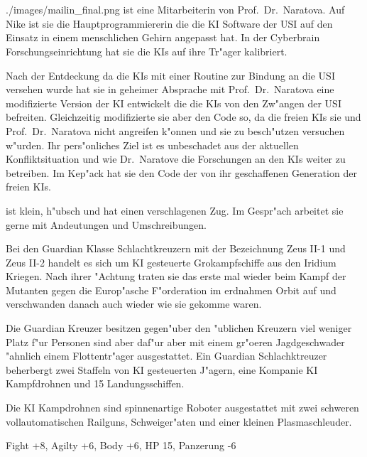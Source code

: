 \newpage
\section[Mailin]{\ml{}}

\begin{sideimagebox}[r]{0.6}{./images/mailin_final.png}{\ml}
    \ml{} ist eine Mitarbeiterin von Prof.~Dr.~Naratova. Auf Nike ist sie die Hauptprogrammiererin die die KI Software der USI auf den Einsatz in einem menschlichen Gehirn angepasst hat.  In der Cyberbrain Forschungseinrichtung hat sie die KIs auf ihre Tr"ager kalibriert.

    Nach der Entdeckung da\3 die KIs mit einer Routine zur Bindung an die USI versehen wurde hat sie in geheimer Absprache mit Prof.~Dr.~Naratova eine modifizierte Version der KI entwickelt die die KIs von den Zw"angen der USI befreiten. Gleichzeitig modifizierte sie aber den Code so, da\3 die freien KIs sie und Prof.~Dr.~Naratova nicht angreifen k"onnen und sie zu besch"utzen versuchen w"urden. Ihr pers"onliches Ziel ist es unbeschadet aus der aktuellen Konfliktsituation und wie Dr.~Naratove die Forschungen an den KIs weiter zu betreiben. Im Kep"ack hat sie den Code der von ihr geschaffenen Generation der freien KIs.

    \ml{} ist klein, h"ubsch und hat einen verschlagenen Zug. Im Gespr"ach arbeitet sie gerne mit Andeutungen und Umschreibungen.
\end{sideimagebox}



Bei den Guardian Klasse Schlachtkreuzern mit der Bezeichnung Zeus II-1 und Zeus II-2 handelt es sich um KI gesteuerte Gro\3kampfschiffe aus den Iridium Kriegen. Nach ihrer "Achtung traten sie das erste mal wieder beim Kampf der Mutanten gegen die Europ"asche F"orderation im erdnahmen Orbit auf und verschwanden danach auch wieder wie sie gekomme waren.

Die Guardian Kreuzer besitzen gegen"uber den "ublichen Kreuzern viel weniger Platz f"ur Personen sind aber daf"ur aber mit einem gr"o\3eren Jagdgeschwader "ahnlich einem Flottentr"ager ausgestattet. Ein Guardian Schlachktreuzer beherbergt zwei Staffeln von KI gesteuerten J"agern, eine Kompanie KI Kampfdrohnen und 15 Landungsschiffen.

Die KI Kampdrohnen sind spinnenartige Roboter ausgestattet mit zwei schweren vollautomatischen Railguns, Schwei\3ger"aten und einer kleinen Plasmaschleuder.

Fight +8, Agilty +6, Body +6, HP 15, Panzerung -6

